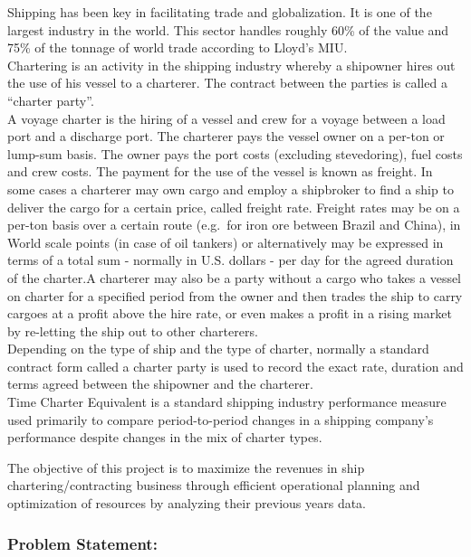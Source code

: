 \documentclass[]{article}
\begin{document}
Shipping has been key in facilitating trade and globalization. It is one
of the largest industry in the world. This sector handles roughly 60\%
of the value and 75\% of the tonnage of world trade according to Lloyd's
MIU.\\
Chartering is an activity in the shipping industry whereby a shipowner
hires out the use of his vessel to a charterer. The contract between the
parties is called a ``charter party''.\\
A voyage charter is the hiring of a vessel and crew for a voyage between
a load port and a discharge port. The charterer pays the vessel owner on
a per-ton or lump-sum basis. The owner pays the port costs (excluding
stevedoring), fuel costs and crew costs. The payment for the use of the
vessel is known as freight. In some cases a charterer may own cargo and
employ a shipbroker to find a ship to deliver the cargo for a certain
price, called freight rate. Freight rates may be on a per-ton basis over
a certain route (e.g.~for iron ore between Brazil and China), in World
scale points (in case of oil tankers) or alternatively may be expressed
in terms of a total sum - normally in U.S. dollars - per day for the
agreed duration of the charter.A charterer may also be a party without a
cargo who takes a vessel on charter for a specified period from the
owner and then trades the ship to carry cargoes at a profit above the
hire rate, or even makes a profit in a rising market by re-letting the
ship out to other charterers.\\
Depending on the type of ship and the type of charter, normally a
standard contract form called a charter party is used to record the
exact rate, duration and terms agreed between the shipowner and the
charterer.\\
Time Charter Equivalent is a standard shipping industry performance
measure used primarily to compare period-to-period changes in a shipping
company's performance despite changes in the mix of charter types.

The objective of this project is to maximize the revenues in ship
chartering/contracting business through efficient operational planning
and optimization of resources by analyzing their previous years data.

\subsubsection{\texorpdfstring{\textbf{Problem
Statement:}}{Problem Statement:}}\label{problem-statement}
\end{document}
